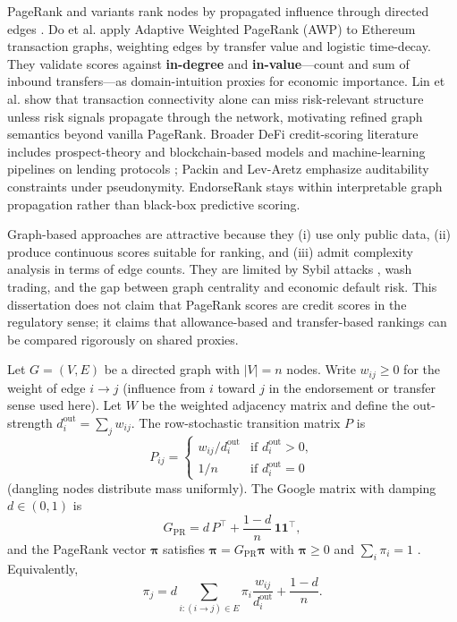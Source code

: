 
PageRank and variants rank nodes by propagated influence through directed edges . Do et al. apply Adaptive Weighted PageRank (AWP) to Ethereum transaction graphs, weighting edges by transfer value and logistic time-decay. They validate scores against \textbf{in-degree} and \textbf{in-value}---count and sum of inbound transfers---as domain-intuition proxies for economic importance. Lin et al. show that transaction connectivity alone can miss risk-relevant structure unless risk signals propagate through the network, motivating refined graph semantics beyond vanilla PageRank. Broader DeFi credit-scoring literature includes prospect-theory and blockchain-based models  and machine-learning pipelines on lending protocols ; Packin and Lev-Aretz emphasize auditability constraints under pseudonymity. EndorseRank stays within interpretable graph propagation rather than black-box predictive scoring.

Graph-based approaches are attractive because they (i) use only public data, (ii) produce continuous scores suitable for ranking, and (iii) admit complexity analysis in terms of edge counts. They are limited by Sybil attacks , wash trading, and the gap between graph centrality and economic default risk. This dissertation does not claim that PageRank scores are credit scores in the regulatory sense; it claims that allowance-based and transfer-based rankings can be compared rigorously on shared proxies.


Let $G=(V,E)$ be a directed graph with $|V|=n$ nodes. Write $w_{ij}\geq 0$ for the weight of edge $i\to j$ (influence from $i$ toward $j$ in the endorsement or transfer sense used here). Let $W$ be the weighted adjacency matrix and define the out-strength $d_i^{\mathrm{out}}=\sum_j w_{ij}$. The row-stochastic transition matrix $P$ is
\begin{equation}
P_{ij} =
\begin{cases}
w_{ij}/d_i^{\mathrm{out}} & \text{if } d_i^{\mathrm{out}}>0,\\
1/n & \text{if } d_i^{\mathrm{out}}=0
\end{cases}
\label{eq:transition}
\end{equation}
(dangling nodes distribute mass uniformly). The Google matrix with damping $d\in(0,1)$ is
\begin{equation}
G_{\mathrm{PR}} = d\, P^{\top} + \frac{1-d}{n}\,\mathbf{1}\mathbf{1}^{\top},
\label{eq:google-matrix}
\end{equation}
and the PageRank vector $\boldsymbol{\pi}$ satisfies $\boldsymbol{\pi}=G_{\mathrm{PR}}\boldsymbol{\pi}$ with $\boldsymbol{\pi}\geq 0$ and $\sum_i \pi_i=1$ . Equivalently,
\begin{equation}
\pi_j = d\sum_{i:(i\to j)\in E}\pi_i \frac{w_{ij}}{d_i^{\mathrm{out}}} + \frac{1-d}{n}.
\label{eq:pagerank-node}
\end{equation}

